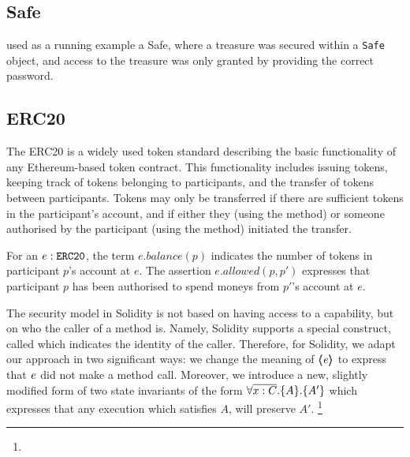 \subsection{Safe}
\cite{FASE} used as a running example   a Safe, where a treasure 
was secured within a \texttt{Safe} object, and access to the treasure was only granted by 
providing the correct password. 
%
%

\subsection{ERC20}

The ERC20 \cite{ERC20} is a widely used token standard describing the basic functionality of any Ethereum-based token 
contract. 
This functionality includes issuing tokens, keeping track of tokens belonging to participants, and the 
transfer of tokens between participants. Tokens may only be transferred if there are sufficient tokens in the 
participant's account, and if either they (using the  method) or someone authorised by the participant (using the  method) initiated the transfer. 

For an $e:\mbox{\normalfont{\texttt{ERC20}}}$, the term $e.balance(p)$  indicates the number of tokens in   participant $p$'s  account at $e$.
The 
assertion $e.allowed(p,p')$ expresses that participant $p$ has been authorised to spend moneys from $p'$'s account at $e$.
 
The security model in Solidity is not based on having access to a capability, but on who the caller of a method is. 
Namely, Solidity supports a special construct, called  which indicates the identity of the caller.
Therefore, for Solidity, we adapt our approach in two significant ways:
we change the meaning of $\langle\!\!\langle \mathit{e} \rangle\!\!\rangle$ to express that $\mathit{e}$ did not make a method call.
Moreover, we introduce a new, slightly modified form of two state invariants of the form $\forall {\overline {x:C}}.{{\{}}{A}{{\}}}. {\{}{A'}{{\}}}$ which expresses that any execution which satisfies $A$, will preserve $A'$.
\footnote{}

